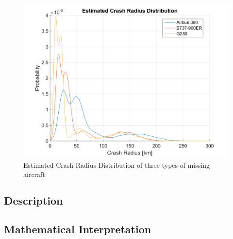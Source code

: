 \documentclass[12pt, letterpaper]{article}  %
\theoremstyle{definition}
\theoremstyle{remark}
\theoremstyle{plain}
\begin{document}


\begin{center}
	\begin{figure}[H]
		\includegraphics[width=0.9\linewidth]{simulation/CrashRadiusExplain.png}
		\caption{Estimated Crash Radius Distribution of three types of missing aircraft}
		\label{fig:CrashRadius}
	\end{figure}
\end{center}


\subsection{Description}\label{subsecmeth:desc}



\subsection{Mathematical Interpretation}\label{subsecDist:math}
\end{document}
